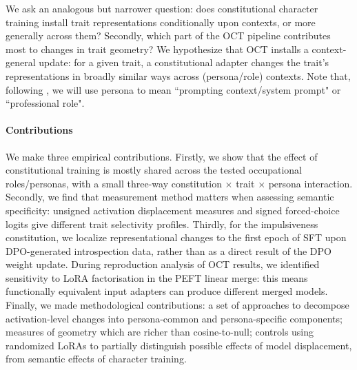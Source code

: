 \documentclass[11pt]{article}
\begin{document}

We ask an analogous but narrower question: does constitutional character training \citep{maiya2025opencharactertrainingshaping} install trait representations conditionally upon contexts, or more generally across them? Secondly, which part of the OCT pipeline contributes most to changes in trait geometry?  We hypothesize that OCT installs a context-general update: for a given trait, a constitutional adapter changes the trait's representations in broadly similar ways across (persona/role) contexts. Note that, following \citet{anonymous2026personas}, we will use persona to mean  ``prompting context/system prompt" or ``professional role".

\paragraph{Contributions}
We make three empirical contributions. Firstly, we show that the effect of constitutional training is mostly shared across the tested occupational roles/personas, with a small three-way constitution $\times$ trait $\times$ persona interaction. Secondly, we find that measurement method matters when assessing semantic specificity: unsigned activation displacement measures and signed forced-choice logits give different trait selectivity profiles. Thirdly, for the impulsiveness constitution, we localize representational changes to the first epoch of SFT upon DPO-generated introspection data, rather than as a direct result of the DPO weight update. During reproduction analysis of OCT results, we identified sensitivity to LoRA factorisation in the PEFT linear merge: this means functionally equivalent input adapters can produce different merged models. Finally, we made methodological contributions: a set of approaches to decompose activation-level changes into persona-common and persona-specific components; measures of geometry which are richer than cosine-to-null; controls using randomized LoRAs to partially distinguish possible effects of model displacement, from semantic effects of character training. 
\end{document}
